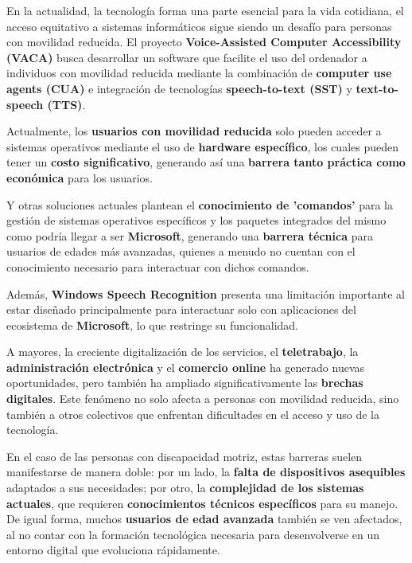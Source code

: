 
En la actualidad, la tecnología forma una parte esencial para la vida cotidiana, el acceso equitativo a sistemas informáticos sigue siendo un desafío para personas con movilidad reducida. El proyecto \textbf{Voice-Assisted Computer Accessibility (VACA)} busca desarrollar un software que facilite el uso del ordenador a individuos con movilidad reducida mediante la combinación de \textbf{computer use agents (CUA)} e integración de tecnologías \textbf{speech-to-text (SST)} y \textbf{text-to-speech (TTS)}.

Actualmente, los \textbf{usuarios con movilidad reducida} solo pueden acceder a sistemas operativos mediante el uso de \textbf{hardware específico}, los cuales pueden tener un \textbf{costo significativo}, generando así una \textbf{barrera tanto práctica como económica} para los usuarios.\cite{Gips1996EyeControl,Gabriel2012Brain-ComputerInterface,Krishnamurthy2006TongueDrive,Taheri2021Hands-FreeController}

Y otras soluciones actuales plantean el \textbf{conocimiento de 'comandos'} para la gestión de sistemas operativos específicos y los paquetes integrados del mismo como podría llegar a ser \textbf{Microsoft}\cite{microsoftWindowsSpeech}, generando una \textbf{barrera técnica} para usuarios de edades más avanzadas, quienes a menudo no cuentan con el conocimiento necesario para interactuar con dichos comandos.

Además, \textbf{Windows Speech Recognition} presenta una limitación importante al estar diseñado principalmente para interactuar solo con aplicaciones del ecosistema de \textbf{Microsoft}, lo que restringe su funcionalidad.

A mayores, la creciente digitalización de los servicios, el \textbf{teletrabajo}, la \textbf{administración electrónica} y el \textbf{comercio online} ha generado nuevas oportunidades, pero también ha ampliado significativamente las \textbf{brechas digitales}. Este fenómeno no solo afecta a personas con movilidad reducida, sino también a otros colectivos que enfrentan dificultades en el acceso y uso de la tecnología.

En el caso de las personas con discapacidad motriz, estas barreras suelen manifestarse de manera doble: por un lado, la \textbf{falta de dispositivos asequibles} adaptados a sus necesidades; por otro, la \textbf{complejidad de los sistemas actuales}, que requieren \textbf{conocimientos técnicos específicos} para su manejo. De igual forma, muchos \textbf{usuarios de edad avanzada} también se ven afectados, al no contar con la formación tecnológica necesaria para desenvolverse en un entorno digital que evoluciona rápidamente.

